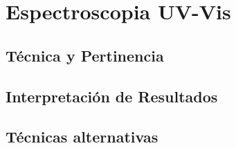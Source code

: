 \section{Espectroscopia UV-Vis}

\subsection{Técnica y Pertinencia}

\subsection{Interpretación de Resultados}

\subsection{Técnicas alternativas}
